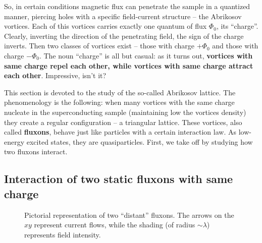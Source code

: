 So, in certain conditions magnetic flux can penetrate the sample in a quantized manner, piercing holes with a specific field-current structure -- the Abrikosov vortices. Each of this vortices carries exactly one quantum of flux $\Phi_0$, its ``charge''. Clearly, inverting the direction of the penetrating field, the sign of the charge inverts. Then two classes of vortices exist -- those with charge $+\Phi_0$ and those with charge $-\Phi_0$. The noun ``charge'' is all but casual: as it turns out, \textbf{vortices with same charge repel each other, while vortices with same charge attract each other}. Impressive, isn't it?

This section is devoted to the study of the so-called Abrikosov lattice. The phenomenology is the following: when many vortices with the same charge nucleate in the superconducting sample (maintaining low the vortices density) they create a regular configuration -- a triangular lattice. These vortices, also called \textbf{fluxons}, behave just like particles with a certain interaction law. As low-energy excited states, they are quasiparticles. First, we take off by studying how two fluxons interact.

\subsection{Interaction of two static fluxons with same charge}

\begin{figure}
	\centering
	
	\caption{Pictorial representation of two ``distant'' fluxons. The arrows on the $xy$ represent current flows, while the shading (of radius $\sim\lambda$) represents field intensity.}
	\label{fig:two fluxons interacting}
\end{figure}

